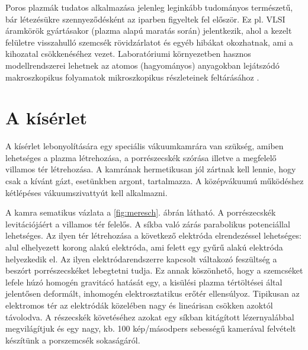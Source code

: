         Poros plazmák tudatos alkalmazása jelenleg leginkább
           tudományos természetű, bár létezésükre szennyeződésként
           az iparben figyeltek fel először. Ez pl. VLSI áramkörök gyártásakor
           (plazma alapú maratás során) jelentkezik, ahol a kezelt
           felületre visszahulló szemcsék rövidzárlatot és egyéb
           hibákat okozhatnak, ami a kihozatal csökkenéséhez
	vezet. Laboratóriumi környezetben hasznos modellrendszerei
        lehetnek az atomos (hagyományos) anyagokban lejátszódó
        makroszkopikus folyamatok mikroszkopikus részleteinek
        feltárásához \cite{Garmisch}. 

\section{A kísérlet}

	A kísérlet lebonyolítására egy speciális vákuumkamrára van szükség, amiben lehetséges a plazma
	létrehozása, a porrészecskék szórása illetve a megfelelő villamos tér létrehozása.
	A kamrának hermetikusan jól zártnak kell lennie, hogy csak a
        kívánt gázt, esetünkben argont, tartalmazza.
	A középvákuumú működéshez kétlépéses vákuumszivattyút kell alkalmazni.
		
	A kamra sematikus vázlata a \ref{fig:meresch}. ábrán látható.
	A porrészecskék levitációjáért a villamos tér felelős. A síkba való zárás parabolikus
	potenciállal lehetséges. Az ilyen tér létrehozása a következő elektróda elrendezéssel lehetséges:
	alul elhelyezett korong alakú elektróda, ami felett egy gyűrű alakú elektróda helyezkedik el.
	Az ilyen elektródarendszerre kapcsolt váltakozó feszültség a beszórt porrészecskéket lebegtetni
	tudja. Ez annak köszönhető, hogy a szemcséket lefele húzó
        homogén gravitácó hatását egy, a kisülési plazma tértöltései
        által jelentősen deformált, inhomogén elektrosztatikus erőtér
        ellensúlyoz. Tipikusan az elektromos tér az elektródák
        közelében nagy és lineárisan csökken azoktól távolodva. 
        A részecskék követéséhez azokat egy síkban kitágított
        lézernyalábbal megvilágítjuk és egy nagy, kb. 100 kép/másodpers sebességű kamerával
	felvételt készítünk a porszemcsék sokaságáról.
	
